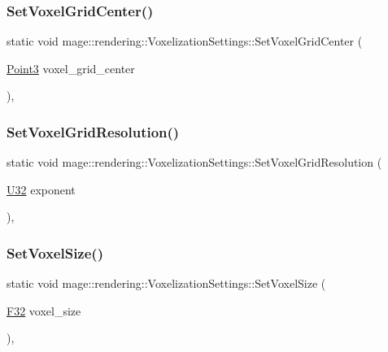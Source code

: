 \subsubsection{\texorpdfstring{Set\+Voxel\+Grid\+Center()}{SetVoxelGridCenter()}}
{\footnotesize\ttfamily static void mage\+::rendering\+::\+Voxelization\+Settings\+::\+Set\+Voxel\+Grid\+Center (\begin{DoxyParamCaption}\item[{\hyperlink{structmage_1_1_point3}{Point3}}]{voxel\+\_\+grid\+\_\+center }\end{DoxyParamCaption})\hspace{0.3cm}{\ttfamily [static]}, {\ttfamily [noexcept]}}

\hypertarget{classmage_1_1rendering_1_1_voxelization_settings_aeffbe093b1df8a738906db2249961ed8}{}\label{classmage_1_1rendering_1_1_voxelization_settings_aeffbe093b1df8a738906db2249961ed8} 
\subsubsection{\texorpdfstring{Set\+Voxel\+Grid\+Resolution()}{SetVoxelGridResolution()}}
{\footnotesize\ttfamily static void mage\+::rendering\+::\+Voxelization\+Settings\+::\+Set\+Voxel\+Grid\+Resolution (\begin{DoxyParamCaption}\item[{\hyperlink{namespacemage_a41c104c036fba3756a74e19f793eeaa1}{U32}}]{exponent }\end{DoxyParamCaption})\hspace{0.3cm}{\ttfamily [static]}, {\ttfamily [noexcept]}}

\hypertarget{classmage_1_1rendering_1_1_voxelization_settings_a4e1c575474a1301981bc0a0070c2c841}{}\label{classmage_1_1rendering_1_1_voxelization_settings_a4e1c575474a1301981bc0a0070c2c841} 
\subsubsection{\texorpdfstring{Set\+Voxel\+Size()}{SetVoxelSize()}}
{\footnotesize\ttfamily static void mage\+::rendering\+::\+Voxelization\+Settings\+::\+Set\+Voxel\+Size (\begin{DoxyParamCaption}\item[{\hyperlink{namespacemage_aa97e833b45f06d60a0a9c4fc22ae02c0}{F32}}]{voxel\+\_\+size }\end{DoxyParamCaption})\hspace{0.3cm}{\ttfamily [static]}, {\ttfamily [noexcept]}}

